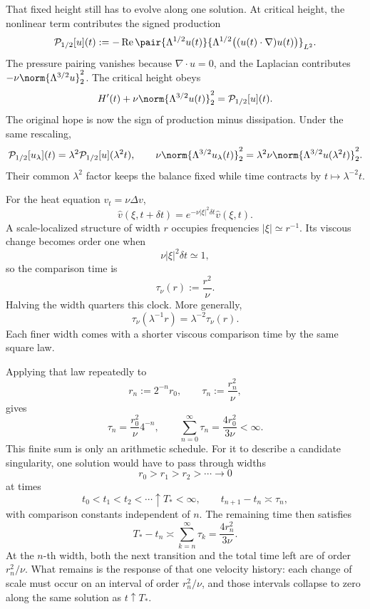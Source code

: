
That fixed height still has to evolve along one solution.
At critical height, the nonlinear term contributes the signed production
\[
  \mathcal P_{1/2}[u](t)
  :=
  -\operatorname{Re}
  \pair
    {\Lambda^{1/2}u(t)}
    {\Lambda^{1/2}\bigl((u(t)\cdot\nabla)u(t)\bigr)}_{L^2}.
\]
The pressure pairing vanishes because \(\nabla\cdot u=0\), and the Laplacian contributes \(-\nu\norm{\Lambda^{3/2}u}_2^2\).
The critical height obeys
\[
  H'(t)
  +
  \nu\norm{\Lambda^{3/2}u(t)}_2^2
  =
  \mathcal P_{1/2}[u](t).
\]
The original hope is now the sign of production minus dissipation.
Under the same rescaling,
\[
  \mathcal P_{1/2}[u_\lambda](t)
  =
  \lambda^2\mathcal P_{1/2}[u](\lambda^2t),
  \qquad
  \nu\norm{\Lambda^{3/2}u_\lambda(t)}_2^2
  =
  \lambda^2\nu\norm{\Lambda^{3/2}u(\lambda^2t)}_2^2.
\]
Their common \(\lambda^2\) factor keeps the balance fixed while time contracts by \(t\mapsto\lambda^{-2}t\).


For the heat equation \(v_t=\nu\Delta v\),
\[
  \widehat v(\xi,t+\delta t)
  =
  e^{-\nu|\xi|^2\delta t}\widehat v(\xi,t).
\]
A scale-localized structure of width \(r\) occupies frequencies \(|\xi|\simeq r^{-1}\).
Its viscous change becomes order one when
\[
  \nu|\xi|^2\delta t\simeq1,
\]
so the comparison time is
\[
  \tau_\nu(r)
  :=
  \frac{r^2}{\nu}.
\]
Halving the width quarters this clock.
More generally,
\[
  \tau_\nu(\lambda^{-1}r)
  =
  \lambda^{-2}\tau_\nu(r).
\]
Each finer width comes with a shorter viscous comparison time by the same square law.


Applying that law repeatedly to
\[
  r_n:=2^{-n}r_0,
  \qquad
  \tau_n:=\frac{r_n^2}{\nu},
\]
gives
\[
  \tau_n
  =
  \frac{r_0^2}{\nu}4^{-n},
  \qquad
  \sum_{n=0}^{\infty}\tau_n
  =
  \frac{4r_0^2}{3\nu}
  <
  \infty.
\]
This finite sum is only an arithmetic schedule.
For it to describe a candidate singularity, one \NavierStokes{} solution would have to pass through widths
\[
  r_0>r_1>r_2>\cdots\longrightarrow0
\]
at times
\[
  t_0<t_1<t_2<\cdots\uparrow T_*<\infty,
  \qquad
  t_{n+1}-t_n\asymp\tau_n,
\]
with comparison constants independent of \(n\).
The remaining time then satisfies
\[
  T_*-t_n
  \asymp
  \sum_{k=n}^{\infty}\tau_k
  =
  \frac{4r_n^2}{3\nu}.
\]
At the \(n\)-th width, both the next transition and the total time left are of order \(r_n^2/\nu\).
What remains is the response of that one velocity history: each change of scale must occur on an interval of order \(r_n^2/\nu\), and those intervals collapse to zero along the same solution as \(t\uparrow T_*\).
